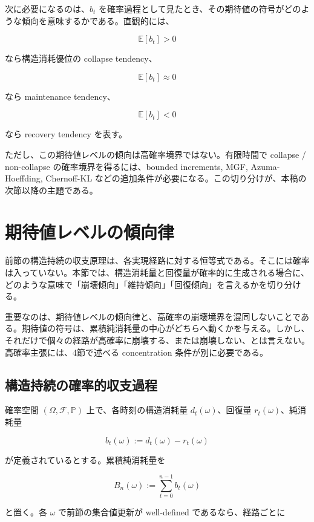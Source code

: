 \documentclass[12pt,a4paper]{article}
\begin{document}
次に必要になるのは、\(b_{t}\) を確率過程として見たとき、その期待値の符号がどのような傾向を意味するかである。直観的には、

\[
\mathbb E[b_{t}] > 0
\]

なら構造消耗優位の collapse tendency、

\[
\mathbb E[b_{t}] \approx 0
\]

なら maintenance tendency、

\[
\mathbb E[b_{t}] < 0
\]

なら recovery tendency を表す。

ただし、この期待値レベルの傾向は高確率境界ではない。有限時間で collapse / non-collapse の確率境界を得るには、bounded increments, MGF, Azuma-Hoeffding, Chernoff-KL などの追加条件が必要になる。この切り分けが、本稿の次節以降の主題である。

\section{期待値レベルの傾向律}\label{ux671fux5f85ux5024ux30ecux30d9ux30ebux306eux50beux5411ux5f8b}

前節の構造持続の収支原理は、各実現経路に対する恒等式である。そこには確率は入っていない。本節では、構造消耗量と回復量が確率的に生成される場合に、どのような意味で「崩壊傾向」「維持傾向」「回復傾向」を言えるかを切り分ける。

重要なのは、期待値レベルの傾向律と、高確率の崩壊境界を混同しないことである。期待値の符号は、累積純消耗量の中心がどちらへ動くかを与える。しかし、それだけで個々の経路が高確率に崩壊する、または崩壊しない、とは言えない。高確率主張には、4節で述べる concentration 条件が別に必要である。

\subsection{構造持続の確率的収支過程}\label{ux69cbux9020ux6301ux7d9aux306eux78baux7387ux7684ux53ceux652fux904eux7a0b}

確率空間 \((\Omega,\mathcal F,\mathbb P)\) 上で、各時刻の構造消耗量 \(d_{t}(\omega)\)、回復量 \(r_{t}(\omega)\)、純消耗量

\[
b_{t}(\omega) := d_{t}(\omega)-r_{t}(\omega)
\]

が定義されているとする。累積純消耗量を

\[
B_{n}(\omega) := \sum_{t=0}^{n-1} b_{t}(\omega)
\]

と置く。各 \(\omega\) で前節の集合値更新が well-defined であるなら、経路ごとに
\end{document}
